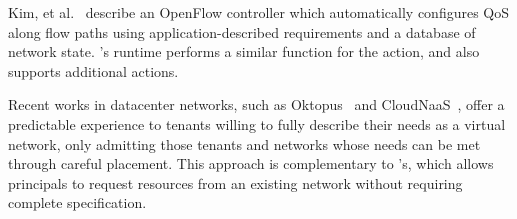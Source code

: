 

Kim, et al.~\cite{Kim:2010} describe an OpenFlow controller which
automatically configures QoS along flow paths using application-described
requirements and a database of network state. \sys's runtime performs
a similar function for the  action, and also supports
additional actions.

Recent works in datacenter networks, such as Oktopus~\cite{Ballani:2011} and
CloudNaaS~\cite{Benson2011cloudnaas}, offer a predictable experience to tenants
willing to fully describe their needs as a virtual network, only admitting those tenants
and networks whose needs can be met through careful placement. This approach
is complementary to \sys's, which allows principals to request resources
from an existing network without requiring complete specification.



